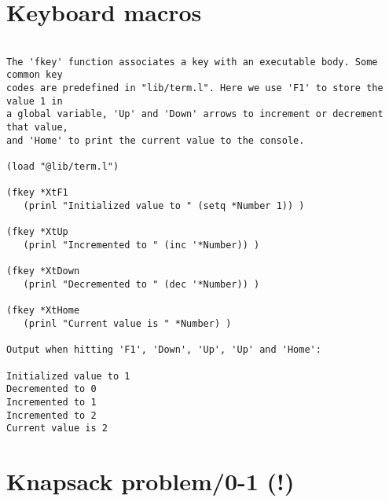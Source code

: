 \section*{Keyboard macros}

\begin{verbatim}

The 'fkey' function associates a key with an executable body. Some common key
codes are predefined in "lib/term.l". Here we use 'F1' to store the value 1 in
a global variable, 'Up' and 'Down' arrows to increment or decrement that value,
and 'Home' to print the current value to the console.

(load "@lib/term.l")

(fkey *XtF1
   (prinl "Initialized value to " (setq *Number 1)) )

(fkey *XtUp
   (prinl "Incremented to " (inc '*Number)) )

(fkey *XtDown
   (prinl "Decremented to " (dec '*Number)) )

(fkey *XtHome
   (prinl "Current value is " *Number) )

Output when hitting 'F1', 'Down', 'Up', 'Up' and 'Home':

Initialized value to 1
Decremented to 0
Incremented to 1
Incremented to 2
Current value is 2

\end{verbatim}

\section*{Knapsack problem/0-1 (!)}

